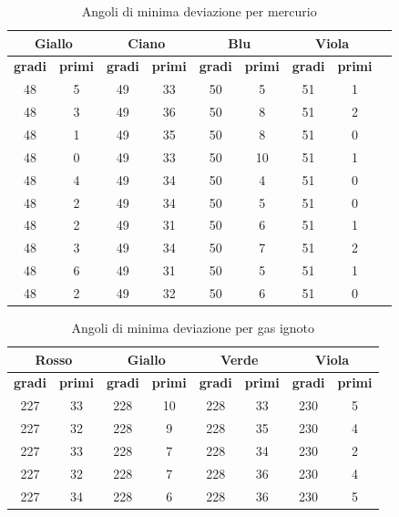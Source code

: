\documentclass[letterpaper,12pt]{article}
\begin{document}
\begin{table}[h!]
    \centering
    \begin{tabular}{|c|c|c|c|c|c|c|c|c|}
    \hline
    \multicolumn{2}{|c|}{\textbf{Giallo}} & \multicolumn{2}{|c|}{\textbf{Ciano}} & \multicolumn{2}{|c|}{\textbf{Blu}} & \multicolumn{2}{|c|}{\textbf{Viola}} \\
    \hline
    \textbf{gradi} & \textbf{primi} & \textbf{gradi} & \textbf{primi} & \textbf{gradi} & \textbf{primi} & \textbf{gradi} & \textbf{primi} \\
    \hline
    48 & 5 & 49 & 33 & 50 & 5 & 51 & 1 \\
    48 & 3 & 49 & 36 & 50 & 8 & 51 & 2 \\
    48 & 1 & 49 & 35 & 50 & 8 & 51 & 0 \\
    48 & 0 & 49 & 33 & 50 & 10 & 51 & 1 \\
    48 & 4 & 49 & 34 & 50 & 4 & 51 & 0 \\
    48 & 2 & 49 & 34 & 50 & 5 & 51 & 0 \\
    48 & 2 & 49 & 31 & 50 & 6 & 51 & 1 \\
    48 & 3 & 49 & 34 & 50 & 7 & 51 & 2 \\
    48 & 6 & 49 & 31 & 50 & 5 & 51 & 1 \\
    48 & 2 & 49 & 32 & 50 & 6 & 51 & 0 \\
    \hline
    \end{tabular}
    \caption{Angoli di minima deviazione per mercurio}
    \label{tab:prisma_md}
    \end{table}

\begin{table}[h!]
    \centering
    \begin{tabular}{|c|c|c|c|c|c|c|c|}
    \hline
    \multicolumn{2}{|c|}{\textbf{Rosso}} & \multicolumn{2}{|c|}{\textbf{Giallo}} & \multicolumn{2}{|c|}{\textbf{Verde}} & \multicolumn{2}{|c|}{\textbf{Viola}} \\
    \hline
    \textbf{gradi} & \textbf{primi} & \textbf{gradi} & \textbf{primi} & \textbf{gradi} & \textbf{primi} & \textbf{gradi} & \textbf{primi} \\    
    \hline
    227 & 33 & 228 & 10 & 228 & 33 & 230 & 5 \\
    227 & 32 & 228 & 9 & 228 & 35 & 230 & 4 \\
    227 & 33 & 228 & 7 & 228 & 34 & 230 & 2 \\
    227 & 32 & 228 & 7 & 228 & 36 & 230 & 4 \\
    227 & 34 & 228 & 6 & 228 & 36 & 230 & 5 \\
    \hline
    \end{tabular}
    \caption{Angoli di minima deviazione per gas ignoto}
    \label{tab:prisma_md_ignoto}
\end{table}
        
\end{document}
